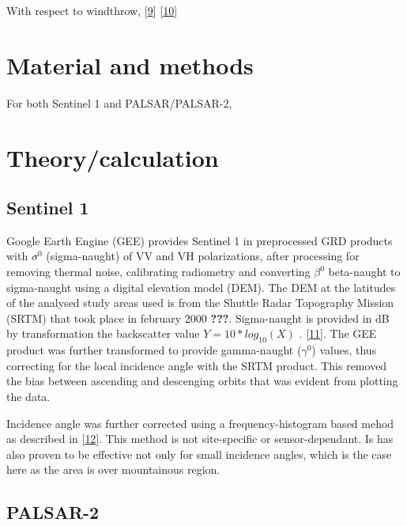 \documentclass[]{elsarticle} %
\begin{document}
With respect to windthrow, {[}\protect\hyperlink{ref-Ruetschi2019}{9}{]}
{[}\protect\hyperlink{ref-Farr_Rosen2007}{10}{]}

\hypertarget{material-and-methods}{%
\section{Material and methods}\label{material-and-methods}}

For both Sentinel 1 and PALSAR/PALSAR-2,

\hypertarget{theorycalculation}{%
\section{Theory/calculation}\label{theorycalculation}}

\hypertarget{sentinel-1}{%
\subsection{Sentinel 1}\label{sentinel-1}}

Google Earth Engine (GEE) provides Sentinel 1 in preprocessed GRD
products with \(\sigma^0\) (sigma-naught) of VV and VH polarizations,
after processing for removing thermal noise, calibrating radiometry and
converting \(\beta^0\) beta-naught to sigma-naught using a digital
elevation model (DEM). The DEM at the latitudes of the analysed study
areas used is from the Shuttle Radar Topography Mission (SRTM) that took
place in february 2000 \textbf{???}. Sigma-naught is provided in dB by
transformation the backscatter value \(Y=10*log_{10}(X)\) .
{[}\protect\hyperlink{ref-Small2011}{11}{]}. The GEE product was further
transformed to provide gamma-naught (\(\gamma^0\)) values, thus
correcting for the local incidence angle with the SRTM product. This
removed the bias between ascending and descenging orbits that was
evident from plotting the data.

Incidence angle was further corrected using a frequency-histogram based
mehod as described in {[}\protect\hyperlink{ref-Mladenova2013}{12}{]}.
This method is not site-specific or sensor-dependant. Is has also proven
to be effective not only for small incidence angles, which is the case
here as the area is over mountainous region.

\hypertarget{palsar-2}{%
\subsection{PALSAR-2}\label{palsar-2}}
\end{document}
